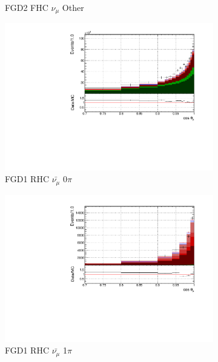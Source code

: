\begin{figure}
\begin{subfigure}{.32\textwidth}
  \caption{FGD2 FHC $\nu_{\mu}$ Other}
  \label{fig:tstack_FGD2_numuCC_other}
\end{subfigure}
\centering
\begin{subfigure}{.32\textwidth}
  \centering
  \includegraphics[width=0.95\linewidth]{figs/FGD1_anti-numuCC_0pi_t}
  \caption{FGD1 RHC $\bar{\nu_{\mu}}$ 0$\pi$}
  \label{fig:tstack_FGD1_anti-numuCC_0pi}
\end{subfigure}
\begin{subfigure}{.32\textwidth}
  \centering
  \includegraphics[width=0.95\linewidth]{figs/FGD1_anti-numuCC_1pi_t}
  \caption{FGD1 RHC $\bar{\nu_{\mu}}$ 1$\pi$}
  \label{fig:tstack_FGD1_anti-numuCC_1pi}
\end{subfigure}
\begin{subfigure}{.32\textwidth}
  \centering

\end{subfigure}
\end{figure}
